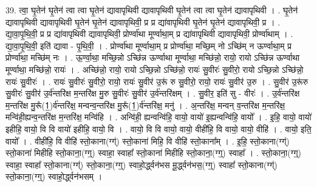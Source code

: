 \documentclass[17pt]{extarticle}
\begin{document}
39. त्वा॒ घृ॒तेन॑ घृ॒तेन॑ त्वा त्वा घृ॒तेन॑ द्यावापृथिवी द्यावापृथिवी घृ॒तेन॑ त्वा त्वा घृ॒तेन॑ द्यावापृथिवी । . घृ॒तेन॑ द्यावापृथिवी द्यावापृथिवी घृ॒तेन॑ घृ॒तेन॑ द्यावापृथिवी॒ प्र प्र द्या॑वापृथिवी घृ॒तेन॑ घृ॒तेन॑ द्यावापृथिवी॒ प्र । . द्या॒वा॒पृ॒थि॒वी॒ प्र प्र द्या॑वापृथिवी द्यावापृथिवी॒ प्रोर्ण्वा॑था मूर्ण्वाथा॒म् प्र द्या॑वापृथिवी द्यावापृथिवी॒ प्रोर्ण्वा॑थाम् । . द्या॒वा॒पृ॒थि॒वी॒ इति॑ द्यावा - पृ॒थि॒वी॒ । . प्रोर्ण्वा॑था मूर्ण्वाथा॒म् प्र प्रोर्ण्वा॑था॒ मच्छि॒म् नो ऽच्छि॑म् न ऊर्ण्वाथा॒म् प्र प्रोर्ण्वा॑था॒ मच्छि॑म् नः । . ऊ॒र्ण्वा॒था॒ मच्छि॒न्नो ऽच्छि॑न्न ऊर्ण्वाथा मूर्ण्वाथा॒ मच्छि॑न्नो॒ रायो॒ रायो ऽच्छि॑न्न ऊर्ण्वाथा मूर्ण्वाथा॒ मच्छि॑न्नो॒ रायः॑ । . अच्छि॑न्नो॒ रायो॒ रायो ऽच्छि॒न्नो ऽच्छि॑न्नो॒ रायः॑ सु॒वीरः॑ सु॒वीरो॒ रायो ऽच्छि॒न्नो ऽच्छि॑न्नो॒ रायः॑ सु॒वीरः॑ । . रायः॑ सु॒वीरः॑ सु॒वीरो॒ रायो॒ रायः॑ सु॒वीर॑ उ॒रू॑ रु सु॒वीरो॒ रायो॒ रायः॑ सु॒वीर॑ उ॒रु । . सु॒वीर॑ उ॒रू॑रु सु॒वीरः॑ सु॒वीर॑ उ॒र्व॑न्तरि॑क्ष म॒न्तरि॑क्ष मु॒रु सु॒वीरः॑ सु॒वीर॑ उ॒र्व॑न्तरि॑क्षम् । . सु॒वीर॒ इति॑ सु - वीरः॑ । . उ॒र्व॑न्तरि॑क्ष म॒न्तरि॑क्ष मु॒रू᳚(1॒)र्व॑न्तरि॑क्ष॒ मन्वन्व॒न्तरि॑क्ष मु॒रू᳚(1॒)र्व॑न्तरि॑क्ष॒ मनु॑ । . अ॒न्तरि॑क्ष॒ मन्वन् व॒न्तरि॑क्ष म॒न्तरि॑क्ष॒ मन्वि॑ही॒ह्यन्व॒न्तरि॑क्ष म॒न्तरि॑क्ष॒ मन्वि॑हि । . अन्वि॑ही॒ ह्यन्वन्वि॑हि॒ वायो॒ वायो॑ इ॒ह्यन्वन्वि॑हि॒ वायो᳚ । . इ॒हि॒ वायो॒ वायो॑ इहीहि॒ वायो॒ वि वि वायो॑ इहीहि॒ वायो॒ वि । . वायो॒ वि वि वायो॒ वायो॒ वीही॑हि॒ वि वायो॒ वायो॒ वीहि॑ । . वायो॒ इति॒ वायो᳚ । . वीही॑हि॒ वि वीहि॑ स्तो॒काना(ग्ग्॑) स्तो॒काना॑ मिहि॒ वि वीहि॑ स्तो॒काना᳚म् । . इ॒हि॒ स्तो॒काना(ग्ग्॑) स्तो॒काना॑ मिहीहि स्तो॒काना॒(ग्ग्॒) स्वाहा॒ स्वाहा᳚ स्तो॒काना॑ मिहीहि स्तो॒काना॒(ग्ग्॒) स्वाहा᳚ । . स्तो॒काना॒(ग्ग्॒) स्वाहा॒ स्वाहा᳚ स्तो॒काना(ग्ग्॑) स्तो॒काना॒(ग्ग्॒) स्वाहो॒र्द्ध्वन॑भस मू॒र्द्ध्वन॑भस॒(ग्ग्॒) स्वाहा᳚ स्तो॒काना(ग्ग्॑) स्तो॒काना॒(ग्ग्॒) स्वाहो॒र्द्ध्वन॑भसम् । \newline
\end{document}
